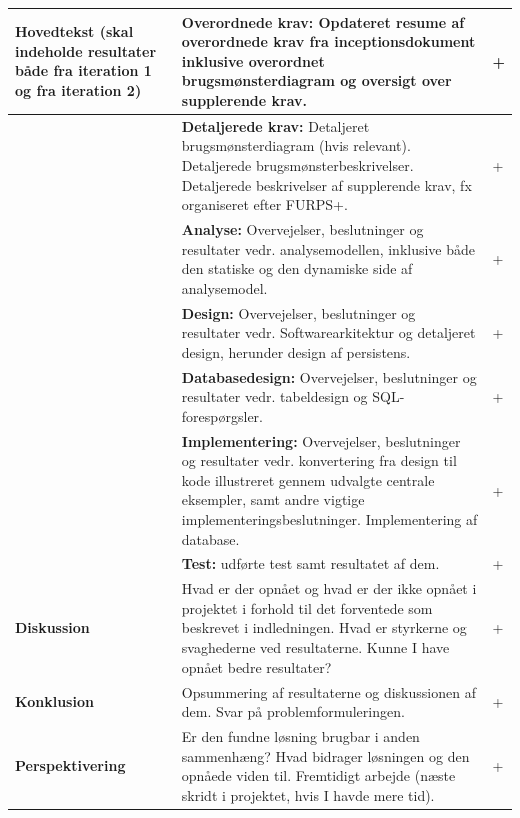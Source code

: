 \begin{longtable}{|p{30mm}|p{90mm}|p{25mm}|}
\textbf{Hovedtekst}
(skal indeholde resultater både fra iteration 1 og fra iteration 2)
    & \textbf{Overordnede krav:}
    Opdateret resume af overordnede krav fra inceptionsdokument inklusive overordnet brugsmønsterdiagram og oversigt over supplerende krav.
                                    &   +         \\ \hline
    & \textbf{Detaljerede krav:}
    Detaljeret brugsmønsterdiagram (hvis relevant).
    Detaljerede brugsmønsterbeskrivelser.
    Detaljerede beskrivelser af supplerende krav, fx organiseret efter FURPS+.
                                        &   +         \\ \hline
    & \textbf{Analyse:} 
    Overvejelser, beslutninger og resultater vedr. analysemodellen, inklusive både den statiske og den dynamiske side af analysemodel. 
                                        &    +       \\ \hline
    & \textbf{Design:}
    Overvejelser, beslutninger og resultater vedr. Softwarearkitektur og detaljeret design, herunder design af persistens. 
                                        &   +        \\ \hline
    & \textbf{Databasedesign:}
    Overvejelser, beslutninger og resultater vedr. tabeldesign og SQL-forespørgsler.
                                        &     +      \\ \hline
    & \textbf{Implementering:}
    Overvejelser, beslutninger og resultater vedr.  konvertering fra design til kode illustreret gennem udvalgte centrale eksempler, samt andre vigtige implementeringsbeslutninger. 
    Implementering af database.
                                        &    +       \\ \hline
    & \textbf{Test:}
    udførte test samt resultatet af dem.
                                        &    +       \\ \hline

\textbf{Diskussion} & Hvad er der opnået og hvad er der ikke opnået i projektet i forhold til det forventede som beskrevet i indledningen. 
Hvad er styrkerne og svaghederne ved resultaterne.
Kunne I have opnået bedre resultater?
                                        &   +        \\ \hline

\textbf{Konklusion} & Opsummering af resultaterne og diskussionen af dem. Svar på problemformuleringen. 
                                        &    +       \\ \hline

\textbf{Perspektivering}   & Er den fundne løsning brugbar i anden sammenhæng?
Hvad bidrager løsningen og den opnåede viden til. 
Fremtidigt arbejde (næste skridt i projektet, hvis I havde mere tid).
                                        &   +        \\ \hline


\end{longtable}
